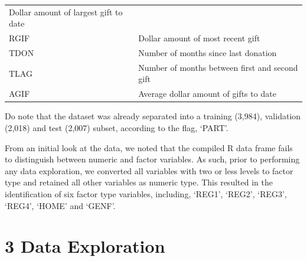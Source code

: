 \documentclass[]{article}
\begin{document}
\begin{longtable}[]{@{}ll@{}}
\begin{minipage}[t]{0.74\columnwidth}
Dollar amount of largest gift to date\strut
\end{minipage}\tabularnewline
\begin{minipage}[t]{0.20\columnwidth}\raggedright\strut
RGIF\strut
\end{minipage} & \begin{minipage}[t]{0.74\columnwidth}\raggedright\strut
Dollar amount of most recent gift\strut
\end{minipage}\tabularnewline
\begin{minipage}[t]{0.20\columnwidth}\raggedright\strut
TDON\strut
\end{minipage} & \begin{minipage}[t]{0.74\columnwidth}\raggedright\strut
Number of months since last donation\strut
\end{minipage}\tabularnewline
\begin{minipage}[t]{0.20\columnwidth}\raggedright\strut
TLAG\strut
\end{minipage} & \begin{minipage}[t]{0.74\columnwidth}\raggedright\strut
Number of months between first and second gift\strut
\end{minipage}\tabularnewline
\begin{minipage}[t]{0.20\columnwidth}\raggedright\strut
AGIF\strut
\end{minipage} & \begin{minipage}[t]{0.74\columnwidth}\raggedright\strut
Average dollar amount of gifts to date\strut
\end{minipage}\tabularnewline
\bottomrule
\end{longtable}

Do note that the dataset was already separated into a training (3,984),
validation (2,018) and test (2,007) subset, according to the flag,
`PART'.

From an initial look at the data, we noted that the compiled R data
frame fails to distinguish between numeric and factor variables. As
such, prior to performing any data exploration, we converted all
variables with two or less levels to factor type and retained all other
variables as numeric type. This resulted in the identification of six
factor type variables, including, `REG1', `REG2', `REG3', `REG4', `HOME'
and `GENF'.

\section{3 Data Exploration}\label{data-exploration}
\end{document}
